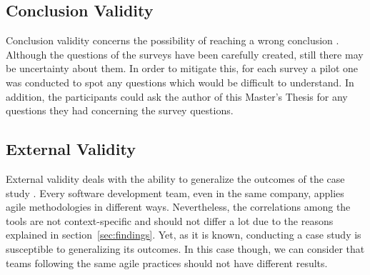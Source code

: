 \subsection{Conclusion Validity}
Conclusion validity concerns the possibility of reaching a wrong conclusion \cite{Wohlin}. Although the questions of the surveys have been carefully created, still there may be uncertainty about them. In order to mitigate this, for each survey a pilot one was conducted to spot any questions which would be difficult to understand. In addition, the participants could ask the author of this Master's Thesis for any questions they had concerning the survey questions.

\subsection{External Validity}
External validity deals with the ability to generalize the outcomes of the case study \cite{Wohlin}. Every software development team, even in the same company, applies agile methodologies in different ways. Nevertheless, the correlations among the tools are not context-specific and should not differ a lot due to the reasons explained in section~\ref{sec:findings}. Yet, as it is known, conducting a case study is susceptible to generalizing its outcomes. In this case though, we can consider that teams following the same agile practices should not have different results.














